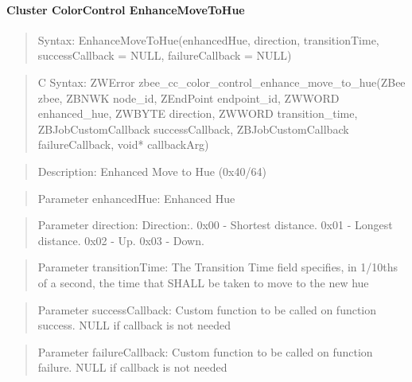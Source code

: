 \paragraph{Cluster ColorControl EnhanceMoveToHue}
\begin{quote}Syntax: EnhanceMoveToHue(enhancedHue, direction, transitionTime, successCallback = NULL, failureCallback = NULL)\end{quote}
\begin{quote}C Syntax: ZWError zbee\_cc\_color\_control\_enhance\_move\_to\_hue(ZBee zbee, ZBNWK node\_id, ZEndPoint endpoint\_id, ZWWORD enhanced\_hue, ZWBYTE direction, ZWWORD transition\_time, ZBJobCustomCallback successCallback, ZBJobCustomCallback failureCallback, void* callbackArg)\end{quote}
\begin{quote}Description: Enhanced Move to Hue (0x40/64)\end{quote}
\begin{quote}Parameter enhancedHue: Enhanced Hue\end{quote}
\begin{quote}Parameter direction: Direction:. 0x00 - Shortest distance. 0x01 - Longest distance. 0x02 - Up. 0x03 - Down. \end{quote}
\begin{quote}Parameter transitionTime: The Transition Time field specifies, in 1/10ths of a second, the time that SHALL be taken to move to the new hue\end{quote}
\begin{quote}Parameter successCallback: Custom function to be called on function success. NULL if callback is not needed\end{quote}
\begin{quote}Parameter failureCallback: Custom function to be called on function failure. NULL if callback is not needed\end{quote}


